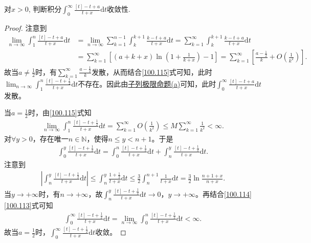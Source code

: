 \documentclass[../../main.tex]{subfiles}%
\begin{document}
\begin{example}
对$x > 0$, 判断积分$\int_0^{\infty} \frac{[t] - t + a}{t + x} \mathrm{d}t$收敛性.
\end{example}
\begin{proof}
注意到
\begin{align}
\lim_{n\to\infty}\int_1^n\frac{[t] - t + a}{t + x}\mathrm{d}t &= \lim_{n\to\infty}\sum_{k=1}^{n-1}\int_k^{k+1}\frac{k - t + a}{t + x}\mathrm{d}t = \sum_{k=1}^{\infty}\int_k^{k+1}\frac{k - t + a}{t + x}\mathrm{d}t\nonumber\\
&= \sum_{k=1}^{\infty}\left[(a + k + x)\ln\left(1 + \frac{1}{k + x}\right) - 1\right] = \sum_{k=1}^{\infty}\left[\frac{a - \frac{1}{2}}{k} + O\left(\frac{1}{k^2}\right)\right].\label{100.115}
\end{align}
故当$a \ne \frac{1}{2}$时，有$\sum_{k=1}^{\infty}\frac{a - \frac{1}{2}}{k}$发散，从而结合\eqref{100.115}式可知，此时$\lim_{n\to\infty}\int_1^n\frac{[t] - t + \frac{1}{2}}{t + x}\mathrm{d}t$不存在。因此由\hyperref[proposition:子列极限命题]{子列极限命题(a)}可知，此时$\int_0^{\infty}\frac{[t] - t + a}{t + x}\mathrm{d}t$发散。

当$a = \frac{1}{2}$时，由\eqref{100.115}式知
\begin{align}
\lim_{n\to\infty}\int_1^n\frac{[t] - t + \frac{1}{2}}{t + x}\mathrm{d}t = \sum_{k=1}^{\infty}O\left(\frac{1}{k^2}\right) \leqslant M\sum_{k=1}^{\infty}\frac{1}{k^2} < \infty.\label{100.114}
\end{align}
对$\forall y > 0$，存在唯一$n \in \mathbb{N}$，使得$n \leqslant y < n + 1$。于是
\begin{align}
\int_0^y\frac{[t] - t + \frac{1}{2}}{t + x}\mathrm{d}t = \int_0^n\frac{[t] - t + \frac{1}{2}}{t + x}\mathrm{d}t + \int_n^y\frac{[t] - t + \frac{1}{2}}{t + x}\mathrm{d}t.\label{100.113}
\end{align}
注意到
\begin{align*}
\left|\int_n^y\frac{[t] - t + \frac{1}{2}}{t + x}\mathrm{d}t\right| \leqslant \int_n^y\frac{1 + \frac{1}{2}}{t + x}\mathrm{d}t \leqslant \frac{3}{2}\int_n^{n+1}\frac{1}{t + x}\mathrm{d}t = \frac{3}{2}\ln\frac{n + 1 + x}{n + x}.
\end{align*}
当$y \to +\infty$时，有$n \to +\infty$，故$\int_n^y\frac{[t] - t + \frac{1}{2}}{t + x}\mathrm{d}t \to 0$，$y \to +\infty$。再结合\eqref{100.114}\eqref{100.113}式可知
\begin{align*}
\int_0^{\infty}\frac{[t] - t + \frac{1}{2}}{t + x}\mathrm{d}t = \lim_{n\to\infty}\int_0^n\frac{[t] - t + \frac{1}{2}}{t + x}\mathrm{d}t < \infty.
\end{align*}
故当$a = \frac{1}{2}$时，$\int_0^{\infty}\frac{[t] - t + \frac{1}{2}}{t + x}\mathrm{d}t$收敛。
\end{proof}
\end{document}
